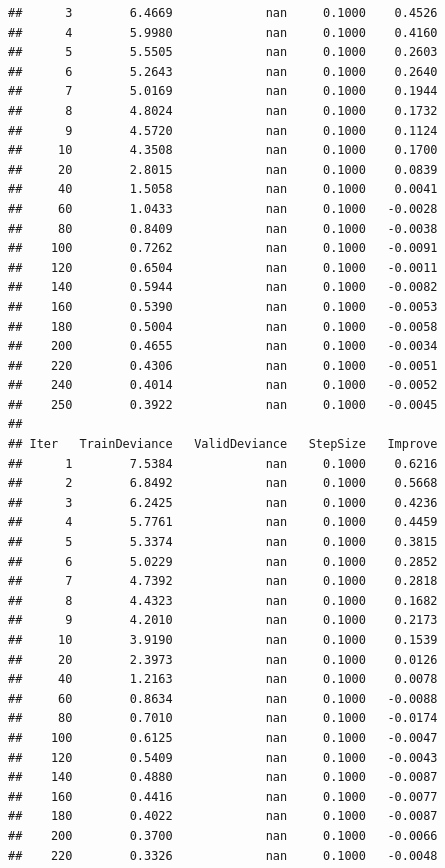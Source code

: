 \documentclass[
]{book}
\begin{document}
\begin{verbatim}
##      3        6.4669             nan     0.1000    0.4526
##      4        5.9980             nan     0.1000    0.4160
##      5        5.5505             nan     0.1000    0.2603
##      6        5.2643             nan     0.1000    0.2640
##      7        5.0169             nan     0.1000    0.1944
##      8        4.8024             nan     0.1000    0.1732
##      9        4.5720             nan     0.1000    0.1124
##     10        4.3508             nan     0.1000    0.1700
##     20        2.8015             nan     0.1000    0.0839
##     40        1.5058             nan     0.1000    0.0041
##     60        1.0433             nan     0.1000   -0.0028
##     80        0.8409             nan     0.1000   -0.0038
##    100        0.7262             nan     0.1000   -0.0091
##    120        0.6504             nan     0.1000   -0.0011
##    140        0.5944             nan     0.1000   -0.0082
##    160        0.5390             nan     0.1000   -0.0053
##    180        0.5004             nan     0.1000   -0.0058
##    200        0.4655             nan     0.1000   -0.0034
##    220        0.4306             nan     0.1000   -0.0051
##    240        0.4014             nan     0.1000   -0.0052
##    250        0.3922             nan     0.1000   -0.0045
## 
## Iter   TrainDeviance   ValidDeviance   StepSize   Improve
##      1        7.5384             nan     0.1000    0.6216
##      2        6.8492             nan     0.1000    0.5668
##      3        6.2425             nan     0.1000    0.4236
##      4        5.7761             nan     0.1000    0.4459
##      5        5.3374             nan     0.1000    0.3815
##      6        5.0229             nan     0.1000    0.2852
##      7        4.7392             nan     0.1000    0.2818
##      8        4.4323             nan     0.1000    0.1682
##      9        4.2010             nan     0.1000    0.2173
##     10        3.9190             nan     0.1000    0.1539
##     20        2.3973             nan     0.1000    0.0126
##     40        1.2163             nan     0.1000    0.0078
##     60        0.8634             nan     0.1000   -0.0088
##     80        0.7010             nan     0.1000   -0.0174
##    100        0.6125             nan     0.1000   -0.0047
##    120        0.5409             nan     0.1000   -0.0043
##    140        0.4880             nan     0.1000   -0.0087
##    160        0.4416             nan     0.1000   -0.0077
##    180        0.4022             nan     0.1000   -0.0087
##    200        0.3700             nan     0.1000   -0.0066
##    220        0.3326             nan     0.1000   -0.0048

\end{verbatim}
\end{document}
